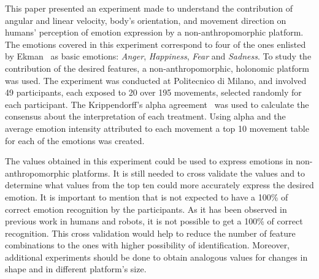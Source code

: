 This paper presented an experiment made to understand the contribution of angular and linear velocity, body's orientation, and movement direction on humans' perception of emotion expression by a non-anthropomorphic platform. The emotions covered in this experiment correspond to four of the ones enlisted by Ekman~\cite{Ekman2001} as basic emotions: \textit{Anger}, \textit{Happiness}, \textit{Fear} and \textit{Sadness}. To study the contribution of the desired features, a non-anthropomorphic, holonomic platform was used. The experiment was conducted at Politecnico di Milano, and involved 49 participants, each exposed to 20 over 195 movements, selected randomly for each participant. The Krippendorff's alpha agreement~\cite{Krippendorff2007} was used to calculate the consensus about the interpretation of each treatment. Using  alpha and the average emotion intensity attributed to each movement a top 10 movement table for each of the emotions was created.

The values obtained in this experiment could be used to express emotions in non-anthropomorphic platforms. It is still needed to cross validate the values and to determine what values from the top ten could more accurately express the desired emotion. It is important to mention that is not expected to have a 100\% of correct emotion recognition by the participants. As it has been observed in previous work in humans and robots, it is not possible to get a 100\% of correct recognition. This cross validation would help to reduce the number of feature combinations to the ones with higher possibility of identification. Moreover, additional experiments should be done to obtain analogous values for changes in shape and in different platform's size. 
